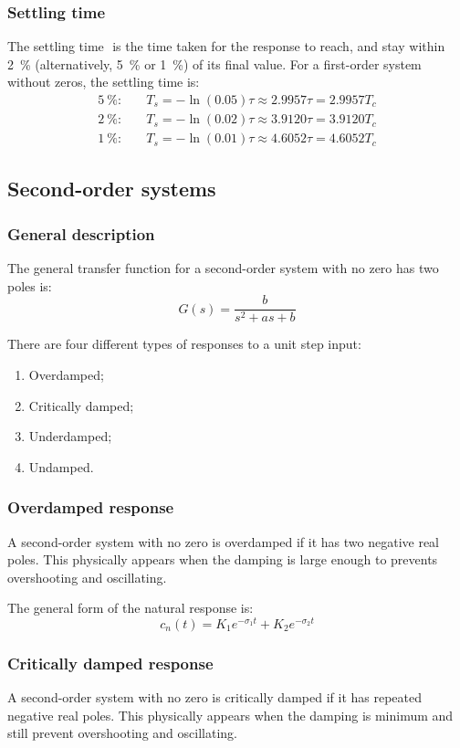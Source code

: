 \documentclass[10pt, twocolumn]{article}
\begin{document}
\subsubsection{Settling time}
The settling time \(\) is the time taken for the response to reach, and stay within \SI{2}{\percent} (alternatively, \SI{5}{\percent} or \SI{1}{\percent}) of its final value.
For a first-order system without zeros, the settling time is:
\begin{align*}
  \SI{5}{\percent}:\quad & T_s = -\ln(0.05)\tau \approx 2.9957 \tau = 2.9957 T_c \\
  \SI{2}{\percent}:\quad & T_s = -\ln(0.02)\tau \approx 3.9120 \tau = 3.9120 T_c \\
  \SI{1}{\percent}:\quad & T_s = -\ln(0.01)\tau \approx 4.6052 \tau = 4.6052 T_c
\end{align*}


\subsection{Second-order systems}
\subsubsection{General description}
The general transfer function for a second-order system with no zero has two poles is:
\[
  G(s) = \frac{b}{s^2 + as + b}
\]

There are four different types of responses to a unit step input:
\begin{enumerate}
  \item Overdamped;
  \item Critically damped;
  \item Underdamped;
  \item Undamped.
\end{enumerate}


\subsubsection{Overdamped response}
A second-order system with no zero is overdamped if it has two negative real poles.
This physically appears when the damping is large enough to prevents overshooting and oscillating.

The general form of the natural response is:
\[
  c_n(t) = K_1 e^{-\sigma_1 t} + K_2 e^{-\sigma_2 t}
\]


\subsubsection{Critically damped response}
A second-order system with no zero is critically damped if it has repeated negative real poles.
This physically appears when the damping is minimum and still prevent overshooting and oscillating.
\end{document}
